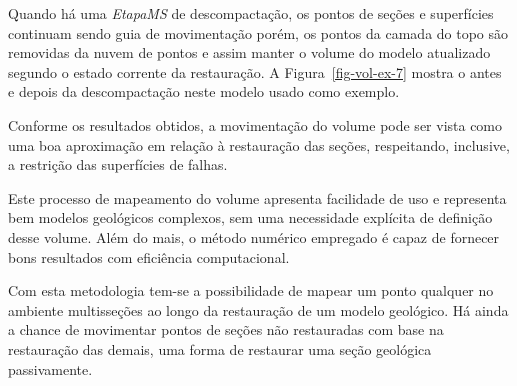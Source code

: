 Quando há uma \emph{EtapaMS} de descompactação, os pontos de seções e superfícies continuam sendo guia de movimentação porém, os pontos da camada do topo são removidas da nuvem de pontos e assim manter o volume do modelo atualizado segundo o estado corrente da restauração. A Figura~\ref{fig-vol-ex-7} mostra o antes e depois da descompactação neste modelo usado como exemplo.

Conforme os resultados obtidos, a movimentação do volume pode ser vista como uma boa aproximação em relação à restauração das seções, respeitando, inclusive, a restrição das superfícies de falhas.

Este processo de mapeamento do volume apresenta facilidade de uso e representa bem modelos geológicos complexos, sem uma necessidade explícita de definição desse volume. Além do mais, o método numérico empregado é capaz de fornecer bons resultados com eficiência computacional.

Com esta metodologia tem-se a possibilidade de mapear um ponto qualquer no ambiente multisseções ao longo da restauração de um modelo geológico. Há ainda a chance de movimentar pontos de seções não restauradas com base na restauração das demais, uma forma de restaurar uma seção geológica passivamente.

